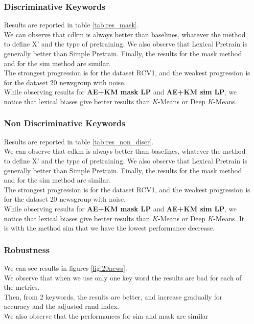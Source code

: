 \subsubsection{Discriminative Keywords}
Results are reported in table \ref{tab:res_mask}.
\\We can observe that cdkm is always better than baselines, whatever the method 
to define X' and the type of pretraining. We also observe that Lexical Pretrain 
is generally better than Simple Pretrain. Finally, the results for the mask method
and for the sim method are similar.
\\The strongest progression is for the dataset RCV1, and the weakest progression 
is for the dataset 20 newsgroup with noise.
\\While observing results for \textbf{AE+KM mask LP} and \textbf{AE+KM sim LP},
we notice that lexical biases give better results than $K$-Means  or Deep 
$K$-Means.
\subsubsection{Non Discriminative Keywords}
Results are reported in table \ref{tab:res_non_discr}.
\\We can observe that cdkm is always better than baselines, whatever the method 
to define X' and the type of pretraining. We also observe that Lexical Pretrain 
is generally better than Simple Pretrain. Finally, the results for the mask method
and for the sim method are similar.
\\The strongest progression is for the dataset RCV1, and the weakest progression 
is for the dataset 20 newsgroup with noise.
\\While observing results for \textbf{AE+KM mask LP} and \textbf{AE+KM sim LP},
we notice that lexical biases give better results than $K$-Means  or Deep 
$K$-Means. It is with the method sim that we have the lowest performance 
decrease.
\subsubsection{Robustness}
We can see results  in figures \ref{fig:20news}.
\\We observe that when we use only one key word the results are bad for each of 
the metrics.
\\Then, from 2 keywords, the results are better, and increase 
gradually for accuracy and the adjusted rand index.
\\We also observe that the performances for sim and mask are similar